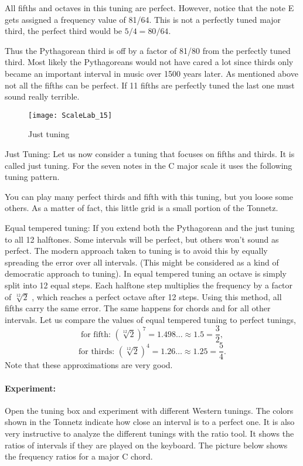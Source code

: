 All fifths and octaves in this tuning are perfect. However, notice that the note E gets assigned a frequency value of 81/64. This is not a perfectly tuned major third, the perfect third would be $5/4=80/64$. 

Thus the Pythagorean third is off by a factor of 81/80 from the perfectly tuned third. Most likely the Pythagoreans would not have cared a lot since thirds only became an important interval in music over 1500 years later. As mentioned above not all the fifths can be perfect. If 11 fifths are perfectly tuned the last one must sound really terrible.

\begin{figure}[h]
\centering
\texttt{[image: ScaleLab\_15]}
\caption*{Just tuning}
\end{figure}

Just Tuning: Let us now consider a tuning that focuses on fifths and thirds. It is called just tuning. For the seven notes in the C major scale it uses the following tuning pattern. 

You can play many perfect thirds and fifth with this tuning, but you loose some others. As a matter of fact, this little grid is a small portion of the Tonnetz.


Equal tempered tuning: If you extend both the Pythagorean and the just tuning to all 12 halftones. Some intervals will be perfect, but others won't sound as perfect. The modern approach taken to tuning is to avoid this by equally spreading the error over all intervals. (This might be considered as a kind of democratic approach to tuning). In equal tempered tuning an octave is simply split into 12 equal steps. Each halftone step multiplies the frequency by a factor of $\sqrt[12]{2}$ , which reaches a perfect octave after 12 steps. Using this method, all fifths carry the same error. The same happens for chords and for all other intervals. Let us compare the values of equal tempered tuning to perfect tunings,
$$\textrm{for fifth: } (\sqrt[12]{2})^7 = 1.498\ldots \approx 1.5 = \frac{3}{2} ,$$
$$\textrm{for thirds: } (\sqrt[12]{2})^4 = 1.26\ldots \approx 1.25 = \frac{5}{4} .$$
Note that these approximations are very good.

\paragraph{Experiment:}
Open the tuning box and experiment with different Western tunings. The colors shown in the Tonnetz indicate how close an interval is to a perfect one. It is also very instructive to analyze the different tunings with the ratio tool. It shows the ratios of intervals if they are played on the keyboard. The picture below shows the frequency ratios for a major C chord.

